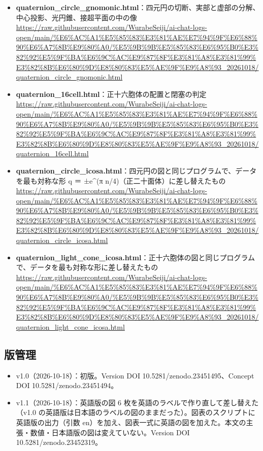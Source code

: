 \documentclass[
  a4paper,
]{ltjsarticle}
\providecommand{\tightlist}{%
  \setlength{\itemsep}{0pt}\setlength{\parskip}{0pt}}
\begin{document}
\begin{itemize}
\tightlist
\item
  \textbf{quaternion\_circle\_gnomonic.html}：四元円の切断、実部と虚部の分解、中心投影、光円錐、接超平面の中の像\\
  \url{https://raw.githubusercontent.com/WurabeSeiji/ai-chat-logs-open/main/\%E6\%AC\%A1\%E5\%85\%83\%E3\%81\%AE\%E7\%94\%9F\%E6\%88\%90\%E6\%A7\%8B\%E9\%80\%A0/\%E5\%9B\%9B\%E5\%85\%83\%E6\%95\%B0\%E3\%82\%92\%E5\%9F\%BA\%E6\%9C\%AC\%E9\%87\%8F\%E3\%81\%A8\%E3\%81\%99\%E3\%82\%8B\%E6\%80\%9D\%E8\%80\%83\%E5\%AE\%9F\%E9\%A8\%93\_20261018/quaternion\_circle\_gnomonic.html}
\item
  \textbf{quaternion\_16cell.html}：正十六胞体の配置と閉塞の判定\\
  \url{https://raw.githubusercontent.com/WurabeSeiji/ai-chat-logs-open/main/\%E6\%AC\%A1\%E5\%85\%83\%E3\%81\%AE\%E7\%94\%9F\%E6\%88\%90\%E6\%A7\%8B\%E9\%80\%A0/\%E5\%9B\%9B\%E5\%85\%83\%E6\%95\%B0\%E3\%82\%92\%E5\%9F\%BA\%E6\%9C\%AC\%E9\%87\%8F\%E3\%81\%A8\%E3\%81\%99\%E3\%82\%8B\%E6\%80\%9D\%E8\%80\%83\%E5\%AE\%9F\%E9\%A8\%93\_20261018/quaternion\_16cell.html}
\item
  \textbf{quaternion\_circle\_icosa.html}：四元円の図と同じプログラムで、データを最も対称な形
  q ＝ ±e\^{}(π n/4)（正二十面体）に差し替えたもの\\
  \url{https://raw.githubusercontent.com/WurabeSeiji/ai-chat-logs-open/main/\%E6\%AC\%A1\%E5\%85\%83\%E3\%81\%AE\%E7\%94\%9F\%E6\%88\%90\%E6\%A7\%8B\%E9\%80\%A0/\%E5\%9B\%9B\%E5\%85\%83\%E6\%95\%B0\%E3\%82\%92\%E5\%9F\%BA\%E6\%9C\%AC\%E9\%87\%8F\%E3\%81\%A8\%E3\%81\%99\%E3\%82\%8B\%E6\%80\%9D\%E8\%80\%83\%E5\%AE\%9F\%E9\%A8\%93\_20261018/quaternion\_circle\_icosa.html}
\item
  \textbf{quaternion\_light\_cone\_icosa.html}：正十六胞体の図と同じプログラムで、データを最も対称な形に差し替えたもの\\
  \url{https://raw.githubusercontent.com/WurabeSeiji/ai-chat-logs-open/main/\%E6\%AC\%A1\%E5\%85\%83\%E3\%81\%AE\%E7\%94\%9F\%E6\%88\%90\%E6\%A7\%8B\%E9\%80\%A0/\%E5\%9B\%9B\%E5\%85\%83\%E6\%95\%B0\%E3\%82\%92\%E5\%9F\%BA\%E6\%9C\%AC\%E9\%87\%8F\%E3\%81\%A8\%E3\%81\%99\%E3\%82\%8B\%E6\%80\%9D\%E8\%80\%83\%E5\%AE\%9F\%E9\%A8\%93\_20261018/quaternion\_light\_cone\_icosa.html}
\end{itemize}

\subsection{版管理}\label{ux7248ux7ba1ux7406}

\begin{itemize}
\tightlist
\item
  v1.0（2026-10-18）：初版。Version DOI 10.5281/zenodo.23451495、Concept
  DOI 10.5281/zenodo.23451494。
\item
  v1.1（2026-10-18）：英語版の図 6
  枚を英語のラベルで作り直して差し替えた（v1.0
  の英語版は日本語のラベルの図のままだった）。図表のスクリプトに英語版の出力（引数
  en）を加え、図表一式に英語の図を加えた。本文の主張・数値・日本語版の図は変えていない。Version
  DOI 10.5281/zenodo.23452319。
\end{itemize}
\end{document}
